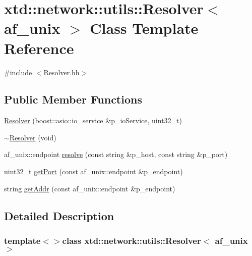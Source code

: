 \hypertarget{classxtd_1_1network_1_1utils_1_1Resolver_3_01af__unix_01_4}{\section{xtd\-:\-:network\-:\-:utils\-:\-:Resolver$<$ af\-\_\-unix $>$ Class Template Reference}
\label{classxtd_1_1network_1_1utils_1_1Resolver_3_01af__unix_01_4}
}


{\ttfamily \#include $<$Resolver.\-hh$>$}

\subsection*{Public Member Functions}
\begin{DoxyCompactItemize}
\item 
\hyperlink{classxtd_1_1network_1_1utils_1_1Resolver_3_01af__unix_01_4_a6c22d97efd1096a2b32c3b6b82707685}{Resolver} (boost\-::asio\-::io\-\_\-service \&p\-\_\-io\-Service, uint32\-\_\-t)
\item 
\hyperlink{classxtd_1_1network_1_1utils_1_1Resolver_3_01af__unix_01_4_a4ef41796801ac9b2b223e907512c6937}{$\sim$\-Resolver} (void)
\item 
af\-\_\-unix\-::endpoint \hyperlink{classxtd_1_1network_1_1utils_1_1Resolver_3_01af__unix_01_4_acabb7ae9d31e60d034e46a7f172f3ffb}{resolve} (const string \&p\-\_\-host, const string \&p\-\_\-port)
\item 
uint32\-\_\-t \hyperlink{classxtd_1_1network_1_1utils_1_1Resolver_3_01af__unix_01_4_a75ade0a088898962a4ca8055885dd09d}{get\-Port} (const af\-\_\-unix\-::endpoint \&p\-\_\-endpoint)
\item 
string \hyperlink{classxtd_1_1network_1_1utils_1_1Resolver_3_01af__unix_01_4_ac684f093294b139e46a7e5b89857c7f1}{get\-Addr} (const af\-\_\-unix\-::endpoint \&p\-\_\-endpoint)
\end{DoxyCompactItemize}


\subsection{Detailed Description}
\subsubsection*{template$<$$>$class xtd\-::network\-::utils\-::\-Resolver$<$ af\-\_\-unix $>$}



